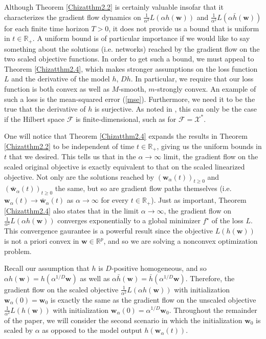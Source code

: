 \documentclass{article}
\begin{document}
Although Theorem \ref{Chizatthm2.2} is certainly valuable insofar that it characterizes the gradient flow dynamics on $\frac{1}{\alpha^2}L(\alpha h(\boldsymbol{w}))$ and $\frac{1}{\alpha^2}L(\alpha \bar{h}(\boldsymbol{w}))$ for each finite time horizon $T > 0$, it does not provide us a bound that is uniform in $t \in \mathbb{R}_+$. A uniform bound is of particular importance if we would like to say something about the solutions (i.e. networks) reached by the gradient flow on the two scaled objective functions. In order to get such a bound, we must appeal to Theorem \ref{Chizatthm2.4}, which makes stronger assumptions on the loss function $L$ and the derivative of the model $h$, $Dh$. In particular, we require that our loss function is both convex as well as $M$-smooth, $m$-strongly convex. An example of such a loss is the mean-squared error (\ref{mse}). Furthermore, we need it to be the true that the derivative of $h$ is surjective. As noted in \cite{chizat2018lazy}, this can only be the case if the Hilbert space $\mathcal{F}$ is finite-dimensional, such as for $\mathcal{F} = \mathcal{X}^*$.

One will notice that Theorem \ref{Chizatthm2.4} expands the results in Theorem \ref{Chizatthm2.2} to be independent of time $t \in \mathbb{R}_+$, giving us the uniform bounds in $t$ that we desired. This tells us that in the $\alpha \rightarrow \infty$ limit, the gradient flow on the scaled original objective is exactly equivalent to that on the scaled linearized objective. Not only are the solutions reached by $(\boldsymbol{w}_{\alpha}(t))_{t \geq 0}$ and $(\boldsymbol{\bar{w}}_{\alpha}(t))_{t \geq 0}$ the same, but so are gradient flow paths themselves (i.e. $\boldsymbol{w}_{\alpha}(t) \rightarrow \boldsymbol{\bar{w}}_{\alpha}(t)$ as $\alpha \rightarrow \infty$ for every $t \in \mathbb{R}_+$). Just as important, Theorem \ref{Chizatthm2.4} also states that in the limit $\alpha \rightarrow \infty$, the gradient flow on $\frac{1}{\alpha^2}L(\alpha h(\boldsymbol{w}))$ converges exponentially to a global minimizer $f^{\star}$ of the loss $L$. This convergence gaurantee is a powerful result since the objective $L(h(\boldsymbol{w}))$ is not a priori convex in $\boldsymbol{w} \in \mathbb{R}^p$, and so we are solving a nonconvex optimization problem.

Recall our assumption that $h$ is $D$-positive homogeneous, and so $\alpha h(\boldsymbol{w}) = h(\alpha^{1/D}\boldsymbol{w})$ as well as $\alpha \bar{h}(\boldsymbol{w}) = \bar{h}(\alpha^{1/D}\boldsymbol{w})$.
Therefore, the gradient flow on the scaled objective $\frac{1}{\alpha^2}L(\alpha h(\boldsymbol{w}))$ with initialization $\boldsymbol{w}_{\alpha}(0) = \boldsymbol{w}_0$ is exactly the same as the gradient flow on the unscaled objective $\frac{1}{\alpha^2}L(h(\boldsymbol{w}))$ with initialization $\boldsymbol{w}_{\alpha}(0) = \alpha^{1/D}\boldsymbol{w}_0$. Throughout the remainder of the paper, we will consider the second scenario in which the initialization $\boldsymbol{w}_0$ is scaled by $\alpha$ as opposed to the model output $h(\boldsymbol{w}_{\alpha}(t))$. 
\end{document}
